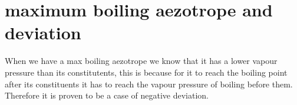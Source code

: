 \documentclass{article}
\begin{document}
\section*{maximum boiling aezotrope and deviation}
When we have a max boiling aezotrope we know that it has a lower vapour pressure than its constitutents, this is because for it to reach the boiling point after its constituents it has to reach the vapour pressure of boiling before them. Therefore it is proven to be a case of negative deviation.
\end{document}
